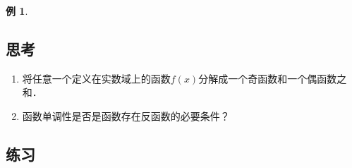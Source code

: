 \documentclass[a4paper,punct=CCT]{ctexbook}
\makeatletter
\theoremstyle{definition}
\newtheorem*{example*}{例}
\theoremstyle{remark}
\newif\ifshowex
\newif\ifshowsolp
\renewenvironment{proof}[1][\proofname]{\par
  \pushQED{\qed}%
  \normalfont \topsep6\p@\@plus6\p@\relax
  \trivlist
  \item[]\ignorespaces
}{%
  \popQED\endtrivlist\@endpefalse
}
\makeatother
\begin{document}
\begin{example*}
\begin{proof}
  \end{proof}
\end{example*}

\subsection*{思考}

\begin{enumerate}
\item 将任意一个定义在实数域上的函数\(f(x)\)分解成一个奇函数和一个偶函数之和．

  \ifshowsolp
  参见奇偶性定义后面的\hyperlink{T:evenodd}{定理}．
  \fi

\item 函数单调性是否是函数存在反函数的必要条件？

  \ifshowsolp
  不是．反例：函数\(y = 1/x\)在定义域上不是单调的，但是存在反函数且反函数就是它自己．
  \fi
\end{enumerate}

\ifshowex
{}
\subsection*{练习}
\end{document}
